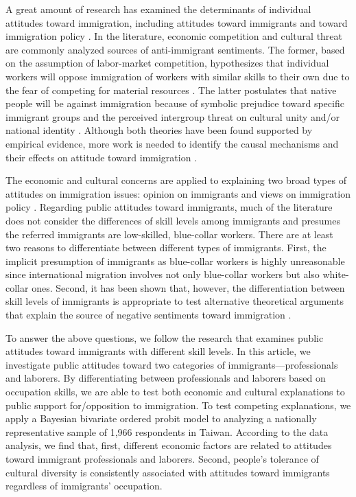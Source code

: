 \documentclass[12pt]{article}
\begin{document}
A great amount of research has examined the determinants of individual attitudes toward immigration, including attitudes toward immigrants \citep[e.g.,][]{EspenshadeCalhoun1993, EspenshadeHempstead1996} and toward immigration policy \citep[e.g.,][]{ChandlerTsai2001, Citrinetal1997}. In the literature, economic competition and cultural threat are commonly analyzed sources of anti-immigrant sentiments. The former, based on the assumption of labor-market competition, hypothesizes that individual workers will oppose immigration of workers with similar skills to their own due to the fear of competing for material resources \citep{Mayda2006, ScheveSlaughter2001}. The latter postulates that native people will be against immigration because of symbolic prejudice toward specific immigrant groups \citep{LeeFiske2006} and the perceived intergroup threat on cultural unity and/or national identity \citep{Blumer1958, BurnsGimpel2000, Quillian1995}. Although both theories have been found supported by empirical evidence, more work is needed to identify the causal mechanisms and their effects on attitude toward immigration \citep{CeobanuEscandell2010, HainmuellerHopkins2014}.


The economic and cultural concerns are applied to explaining two broad types of attitudes on immigration issues: opinion on immigrants and views on immigration policy \citep{CeobanuEscandell2010}. Regarding public attitudes toward immigrants, much of the literature does not consider the differences of skill levels among immigrants and presumes the referred immigrants are low-skilled, blue-collar workers. There are at least two reasons to differentiate between different types of immigrants. First, the implicit presumption of immigrants as blue-collar workers is highly unreasonable since international migration involves not only blue-collar workers but also white-collar ones. Second, it has been shown that, however, the differentiation between skill levels of immigrants is appropriate to test alternative theoretical arguments that explain the source of negative sentiments toward immigration \citep{HainmuellerHiscox2007}. 


To answer the above questions, we follow the research that examines public attitudes toward immigrants with different skill levels. In this article, we investigate public attitudes toward two categories of immigrants---professionals and laborers. By differentiating between professionals and laborers based on occupation skills, we are able to test both economic and cultural explanations to public support for/opposition to immigration. To test competing explanations, we apply a Bayesian bivariate ordered probit model to analyzing a nationally representative sample of 1,966 respondents in Taiwan. According to the data analysis, we find that, first, different economic factors are related to attitudes toward immigrant professionals and laborers. Second, people's tolerance of cultural diversity is consistently associated with attitudes toward immigrants regardless of immigrants' occupation.
\end{document}
